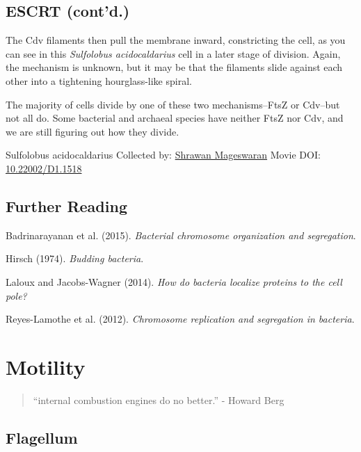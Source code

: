 \documentclass[]{tufte-book}
\begin{document}
\hypertarget{escrt-contd.}{%
\section{ESCRT (cont'd.)}\label{escrt-contd.}}

The Cdv filaments then pull the membrane inward, constricting the cell, as you can see in this \emph{Sulfolobus acidocaldarius} cell in a later stage of division. Again, the mechanism is unknown, but it may be that the filaments slide against each other into a tightening hourglass-like spiral.

The majority of cells divide by one of these two mechanisms--FtsZ or Cdv--but not all do. Some bacterial and archaeal species have neither FtsZ nor Cdv, and we are still figuring out how they divide.



\hypertarget{htmlwidget-819f9400b7025aadafc8}{}

\label{fig:5-12}Sulfolobus acidocaldarius Collected by: \protect\hyperlink{shrawan_mageswaran}{Shrawan Mageswaran} Movie DOI: \href{https://doi.org/10.22002/D1.1518}{10.22002/D1.1518}

\hypertarget{further-reading-4}{%
\section{Further Reading}\label{further-reading-4}}

Badrinarayanan et al. (2015). \emph{Bacterial chromosome organization and segregation}.\citep{badrinarayanan2015}

Hirsch (1974). \emph{Budding bacteria}.\citep{hirsch1974}

Laloux and Jacobs-Wagner (2014). \emph{How do bacteria localize proteins to the cell pole?}\citep{laloux2014}

Reyes-Lamothe et al. (2012). \emph{Chromosome replication and segregation in bacteria}.\citep{reyes-lamothe2012}

\hypertarget{motility}{%
\chapter{Motility}\label{motility}}

\begin{quote}
``internal combustion engines do no better.''
- Howard Berg \citep{berg1988}
\end{quote}

\hypertarget{flagellum}{%
\section{Flagellum}\label{flagellum}}
\end{document}
